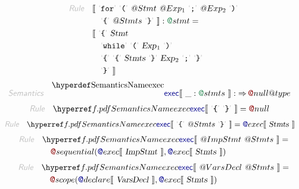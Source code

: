 \begin{align*}
  \KEY{Rule} \quad
    & \LEFTPHRASE \
        \LEX{for} \ \LEX{{(}} \ \VAR@Stmt \ \VAR@Exp\SUB{1} \ \LEX{{;}} \ \VAR@Exp\SUB{2} \ \LEX{{)}} \\&\quad
        \LEX{{\LEFTBRACE}} \ \VAR@Stmts \ \LEX{{\RIGHTBRACE}} \
      \RIGHTPHRASE : \SYN@stmt = \\&
      \LEFTPHRASE \
        \LEX{{\LEFTBRACE}} \ \VAR{Stmt} \\&\quad
        \LEX{while} \ \LEX{{(}} \ \VAR{Exp}\SUB{1} \ \LEX{{)}} \\&\quad
        \LEX{{\LEFTBRACE}} \ \LEX{{\LEFTBRACE}} \ \VAR{Stmts} \ \LEX{{\RIGHTBRACE}} \ \VAR{Exp}\SUB{2} \ \LEX{{;}} \ \LEX{{\RIGHTBRACE}} \\&\quad
        \LEX{{\RIGHTBRACE}} \
      \RIGHTPHRASE
\end{align*}
\begin{align*}
  \KEY{Semantics} \quad
  & \SEMDEC{exec} \LEFTPHRASE \ \_ : \SYN@stmts \ \RIGHTPHRASE  
    :  \TO \FUN@null@type 
\end{align*}
\begin{align*}
  \KEY{Rule} \quad
    & \SEMREF{exec} \LEFTPHRASE \
                            \LEX{{\LEFTBRACE}} \ \LEX{{\RIGHTBRACE}} \
                          \RIGHTPHRASE  = 
      \FUN@null
\end{align*}
\begin{align*}
  \KEY{Rule} \quad
    & \SEMREF{exec} \LEFTPHRASE \
                            \LEX{{\LEFTBRACE}} \ \VAR@Stmts \ \LEX{{\RIGHTBRACE}} \
                          \RIGHTPHRASE  = 
      \SEM@exec \LEFTPHRASE \
                \VAR{Stmts} \
              \RIGHTPHRASE 
\end{align*}
\begin{align*}
  \KEY{Rule} \quad
    & \SEMREF{exec} \LEFTPHRASE \
                            \VAR@ImpStmt \ \VAR@Stmts \
                          \RIGHTPHRASE  = \\&\quad
      \FUN@sequential
        (  \SEM@exec \LEFTPHRASE \
                        \VAR{ImpStmt} \
                      \RIGHTPHRASE , 
               \SEM@exec \LEFTPHRASE \
                        \VAR{Stmts} \
                      \RIGHTPHRASE  )
\end{align*}
\begin{align*}
  \KEY{Rule} \quad
    & \SEMREF{exec} \LEFTPHRASE \
                            \VAR@VarsDecl \ \VAR@Stmts \
                          \RIGHTPHRASE  = \\&\quad
      \FUN@scope
        (  \SEM@declare \LEFTPHRASE \
                        \VAR{VarsDecl} \
                      \RIGHTPHRASE , 
               \SEM@exec \LEFTPHRASE \
                        \VAR{Stmts} \
                      \RIGHTPHRASE  )
\end{align*}
